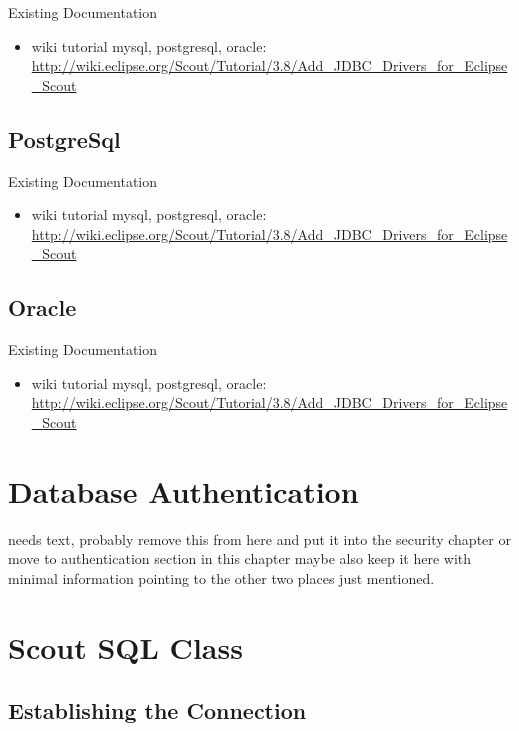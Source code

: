 \documentclass[a4paper,10pt,twoside]{book}
\begin{document}
\noindent Existing Documentation
\begin{itemize}
  \item wiki tutorial mysql, postgresql, oracle: \url{http://wiki.eclipse.org/Scout/Tutorial/3.8/Add_JDBC_Drivers_for_Eclipse_Scout}
\end{itemize}

\subsection{PostgreSql}

\noindent Existing Documentation
\begin{itemize}
  \item wiki tutorial mysql, postgresql, oracle: \url{http://wiki.eclipse.org/Scout/Tutorial/3.8/Add_JDBC_Drivers_for_Eclipse_Scout}
\end{itemize}

\subsection{Oracle}

\noindent Existing Documentation
\begin{itemize}
  \item wiki tutorial mysql, postgresql, oracle: \url{http://wiki.eclipse.org/Scout/Tutorial/3.8/Add_JDBC_Drivers_for_Eclipse_Scout}
\end{itemize}

\section{Database Authentication}
needs text, probably remove this from here and put it into the security chapter or move to authentication section in this chapter
maybe also keep it here with minimal information pointing to the other two places just mentioned.

\section{Scout SQL Class}

\subsection{Establishing the Connection}
\end{document}
